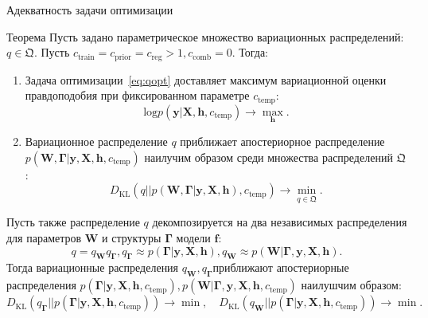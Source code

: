 \documentclass[usenames,dvipsnames,11pt,pdf,utf8,russian,aspectratio=43]{beamer}
\begin{document}
\begin{frame}{Адекватность задачи оптимизации}
\tiny   
\begin{block}{Теорема}
Пусть задано параметрическое множество вариационных распределений: $q \in \mathfrak{Q}$. 
Пусть $c_\text{train} = c_\text{prior}=c_\text{reg}>1, c_{\text{comb}}=0$. Тогда:
\begin{enumerate}
\item Задача оптимизации~\eqref{eq:qopt} доставляет максимум вариационной оценки правдоподобия при фиксированном параметре $c_\text{temp}$:
\[
    \text{log}p(\mathbf{y}|\mathbf{X}, \mathbf{h}, c_\text{temp}) \to \max_{\mathbf{h}}.
\]
\item Вариационное распределение $q$ приближает апостериорное распределение $p(\mathbf{W}, \boldsymbol{\Gamma}|\mathbf{y}, \mathbf{X}, \mathbf{h}, c_\text{temp})$ наилучим образом среди множества распределений $\mathfrak{Q}$:
\[
    {D}_\text{KL}(q||p(\mathbf{W}, \boldsymbol{\Gamma}|\mathbf{y}, \mathbf{X}, \mathbf{h}), c_\text{temp}) \to \min_{q \in \mathfrak{Q}}.
\]
\end{enumerate}
\end{block}
\begin{block}{}
Пусть также распределение $q$ декомпозируется на два независимых распределения для параметров $\mathbf{W}$ и структуры $\boldsymbol{\Gamma}$ модели $\mathbf{f}$:
\[
    q = q_{\mathbf{W}}q_{\boldsymbol{\Gamma}}, q_{\boldsymbol{\Gamma}} \approx p(\boldsymbol{\Gamma}|\mathbf{y}, \mathbf{X}, \mathbf{h}), q_{\mathbf{W}} \approx p(\mathbf{W}|\boldsymbol{\Gamma},\mathbf{y}, \mathbf{X}, \mathbf{h}).
\]
Тогда вариационные распределения $q_{\mathbf{W}}, q_{\boldsymbol{\Gamma}}$приближают апостериорные распределения $ p(\boldsymbol{\Gamma}|\mathbf{y}, \mathbf{X}, \mathbf{h}, c_\text{temp}), p(\mathbf{W}|\boldsymbol{\Gamma},\mathbf{y}, \mathbf{X}, \mathbf{h}, c_\text{temp})$ наилушчим образом:
\[
    {D}_\text{KL}(q_{\boldsymbol{\Gamma}}||p(\boldsymbol{\Gamma}|\mathbf{y}, \mathbf{X}, \mathbf{h}, c_\text{temp})) \to \min, \quad
    {D}_\text{KL}(q_{\mathbf{W}}||p(\boldsymbol{\Gamma}|\mathbf{y}, \mathbf{X}, \mathbf{h}, c_\text{temp})) \to \min.
\]

\end{block}
\end{frame}
\end{document}
